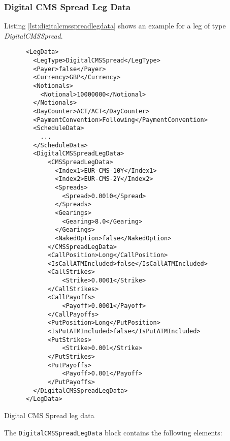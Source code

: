 \subsubsection{Digital CMS Spread Leg Data}
\label{ss:digitalcmsspreadlegdata}

Listing \ref{lst:digitalcmsspreadlegdata} shows an example for a leg of type \emph{DigitalCMSSpread}.

\begin{listing}[H]
\begin{verbatim}
      <LegData>
        <LegType>DigitalCMSSpread</LegType>
        <Payer>false</Payer>
        <Currency>GBP</Currency>
        <Notionals>
          <Notional>10000000</Notional>
        </Notionals>
        <DayCounter>ACT/ACT</DayCounter>
        <PaymentConvention>Following</PaymentConvention>
        <ScheduleData>
          ...
        </ScheduleData>
        <DigitalCMSSpreadLegData>
            <CMSSpreadLegData>
              <Index1>EUR-CMS-10Y</Index1>
              <Index2>EUR-CMS-2Y</Index2>
              <Spreads>
                <Spread>0.0010</Spread>
              </Spreads>
              <Gearings>
                <Gearing>8.0</Gearing>
              </Gearings>
              <NakedOption>false</NakedOption>
            </CMSSpreadLegData>
            <CallPosition>Long</CallPosition>
            <IsCallATMIncluded>false</IsCallATMIncluded>
            <CallStrikes>
                <Strike>0.0001</Strike>
            </CallStrikes>
            <CallPayoffs>
                <Payoff>0.0001</Payoff>
            </CallPayoffs>
            <PutPosition>Long</PutPosition>
            <IsPutATMIncluded>false</IsPutATMIncluded>
            <PutStrikes>
                <Strike>0.001</Strike>
            </PutStrikes>
            <PutPayoffs>
                <Payoff>0.001</Payoff>
            </PutPayoffs>
        </DigitalCMSSpreadLegData>
      </LegData>
\end{verbatim}
\caption{Digital CMS Spread leg data}
\label{lst:digitalcmsspreadlegdata}
\end{listing}

The \lstinline!DigitalCMSSpreadLegData! block contains the following elements:

